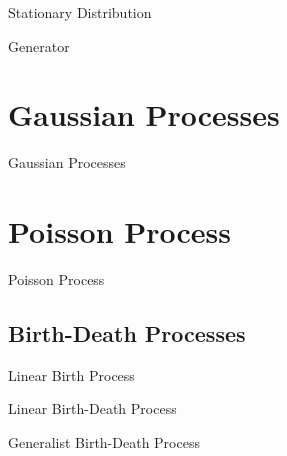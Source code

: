 \documentclass[11pt,a4paper]{article}
\begin{document}
\begin{definition}{Stationary Distribution}

\end{definition}

\begin{definition}{Generator}

\end{definition}

\section{Gaussian Processes}

\begin{definition}{Gaussian Processes}

\end{definition}

\section{Poisson Process}

\begin{definition}{Poisson Process}
\end{definition}

\subsection{Birth-Death Processes}

\begin{definition}{Linear Birth Process}
\end{definition}

\begin{definition}{Linear Birth-Death Process}

\end{definition}

\begin{definition}{Generalist Birth-Death Process}

\end{definition}
\end{document}
